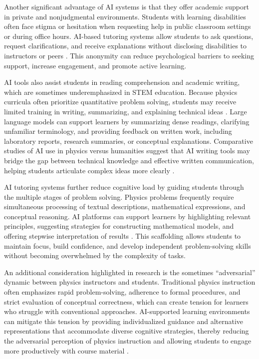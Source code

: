 \documentclass[]{aastex701}
\begin{document}
Another significant advantage of AI systems is that they offer academic support in private and nonjudgmental environments. Students with learning disabilities often face stigma or hesitation when requesting help in public classroom settings or during office hours. AI-based tutoring systems allow students to ask questions, request clarifications, and receive explanations without disclosing disabilities to instructors or peers \citep{Khowaja2025}. This anonymity can reduce psychological barriers to seeking support, increase engagement, and promote active learning.

AI tools also assist students in reading comprehension and academic writing, which are sometimes underemphasized in STEM education. Because physics curricula often prioritize quantitative problem solving, students may receive limited training in writing, summarizing, and explaining technical ideas \citep{Alenezi2025}. Large language models can support learners by summarizing dense readings, clarifying unfamiliar terminology, and providing feedback on written work, including laboratory reports, research summaries, or conceptual explanations. Comparative studies of AI use in physics versus humanities suggest that AI writing tools may bridge the gap between technical knowledge and effective written communication, helping students articulate complex ideas more clearly \citep{Alenezi2025}.

AI tutoring systems further reduce cognitive load by guiding students through the multiple stages of problem solving. Physics problems frequently require simultaneous processing of textual descriptions, mathematical expressions, and conceptual reasoning. AI platforms can support learners by highlighting relevant principles, suggesting strategies for constructing mathematical models, and offering stepwise interpretation of results \citep{Paglialunga2025, Sweller2011}. This scaffolding allows students to maintain focus, build confidence, and develop independent problem-solving skills without becoming overwhelmed by the complexity of tasks.

An additional consideration highlighted in research is the sometimes ``adversarial'' dynamic between physics instructors and students. Traditional physics instruction often emphasizes rapid problem-solving, adherence to formal procedures, and strict evaluation of conceptual correctness, which can create tension for learners who struggle with conventional approaches. AI-supported learning environments can mitigate this tension by providing individualized guidance and alternative representations that accommodate diverse cognitive strategies, thereby reducing the adversarial perception of physics instruction and allowing students to engage more productively with course material \citep{Paglialunga2025, Khowaja2025}.
\end{document}
